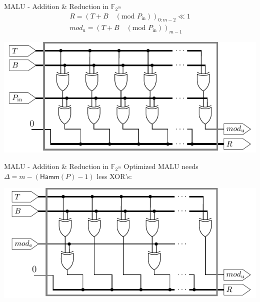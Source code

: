 \documentclass[svgnames, handout,t]{beamer}
\newenvironment{changemargin}[2]{%
\begin{list}{}{%
\setlength{\topsep}{0pt}%
\setlength{\leftmargin}{#1}%
\setlength{\rightmargin}{#2}%
\setlength{\listparindent}{\parindent}%
\setlength{\itemindent}{\parindent}%
\setlength{\parsep}{\parskip}%
}%
\item[]}{\end{list}}
\begin{document}
\begin{frame}{MALU - Addition \& Reduction in $\mathbb{F}_{2^m}$}
\\[-1em]
	\[\begin{gathered}
		R = \left(T + B \quad (\text{mod } P_{\text{in}}) \right)_{0:m-2} \ll 1 \\
		mod_{\text{u}} = \left(T + B \quad (\text{mod } P_{\text{in}}) \right)_{m - 1}
	\end{gathered}\]
	\begin{changemargin}{-2cm}{-2cm}
	\begin{center}\includegraphics[height=0.5\paperheight]{images/malu-basic}\end{center}
	\end{changemargin}
\end{frame}

\begin{frame}{MALU - Addition \& Reduction in $\mathbb{F}_{2^m}$}
	Optimized MALU needs $\Delta = m - \left( \textsf{Hamm}(P) - 1 \right)$ less XOR's:\\[1.7em]
	\begin{changemargin}{-2cm}{-2cm}
	\begin{center}\includegraphics[height=0.5\paperheight]{images/malu-optimized}\end{center}
	\end{changemargin}
\end{frame}
\end{document}
